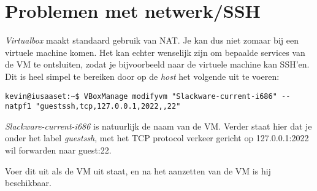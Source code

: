 \section{Problemen met netwerk/SSH}
\emph{Virtualbox} maakt standaard gebruik van NAT. Je kan dus niet zomaar bij een virtuele machine komen. Het kan echter wenselijk zijn om bepaalde services van de VM te ontsluiten, zodat je bijvoorbeeld naar de virtuele machine kan SSH'en. Dit is heel simpel te bereiken door op de \emph{host} het volgende uit te voeren:
\begin{lstlisting}
kevin@iusaaset:~$ VBoxManage modifyvm "Slackware-current-i686" --natpf1 "guestssh,tcp,127.0.0.1,2022,,22"
\end{lstlisting}%
\emph{Slackware-current-i686} is natuurlijk de naam van de VM. Verder staat hier dat je onder het label \emph{guestssh}, met het TCP protocol verkeer gericht op 127.0.0.1:2022 wil forwarden naar guest:22. 

Voer dit uit als de VM uit staat, en na het aanzetten van de VM is hij beschikbaar.
